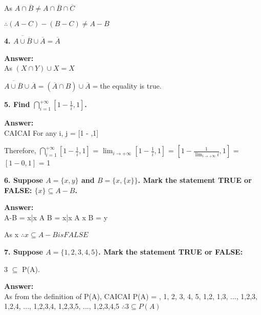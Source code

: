 \documentclass{article}
\begin{document}
\begin{large}
As $A \cap \overline{B} \neq A \cap \overline{B} \cap \overline{C}$

$\therefore (A-C)-(B-C) \neq A-B$

\textbf{4. $\overline{A\cup \overline{B}} \cup \overline{A}=\overline{A}$}

\textbf{Answer:} \\

As $(X \cap Y) \cup X = X$

$\overline{A\cup \overline{B}} \cup \overline{A} = (\overline{A} \cap B) \cup \overline{A}
                                                 = $$

$\therefore the equality is true.

\textbf{5. Find $\bigcap\limits_{i=1}^{+\infty}[1-\frac{1}{i}, 1]$.}

\textbf{Answer:} \\

             CAICAI
For any i, j \in [1, +\infty), i and j are integers and i < j
                         CAICAI
we know $1 - \frac{1}{i} \lessthan \frac{1}{j}$

we know [1 - \frac{1}{i}, 1] \cap [1 - \frac{1}{j},1] = [1 - ,1]

Therefore, $\bigcap\limits_{i=1}^{+\infty}[1-\frac{1}{i}, 1]$ = $\lim_{i\to + \infty} [1 - \frac{1}{i},1]$
                                                              = $[1 - \frac{1}{\lim_{i\to + \infty}i}, 1]$
                                                              = $[1 - 0, 1]$
                                                              = 1


\textbf{6. Suppose $A=\{x,y\}$ and $B=\{x,\{x\}\}$. Mark the statement TRUE or FALSE: $\{x\}\subseteq A-B$.}

\textbf{Answer:} \\

A-B = {x|x \in A \cap \overline B}
    = {x|x \in A \land x \notin B}
    = {y}

As {x} 
$\therefore {x} \subseteq A-B is FALSE$


\textbf{7. Suppose $A=\{1,2,3,4,5\}$. Mark the statement TRUE or FALSE:}

{{3}} $\subseteq$ P(A).

\textbf{Answer:} \\

As from the definition of P(A), 
        CAICAI
P(A) = {\nothing, {1}, {2}, {3}, {4}, {5}, {1,2}, {1,3}, ..., {1,2,3}, {1,2,4}, ..., {1,2,3,4}, {1,2,3,5}, ..., {1,2,3,4,5}}
$\therefore {{3}} \subseteq P(A)$



\end{large}
\end{document}
